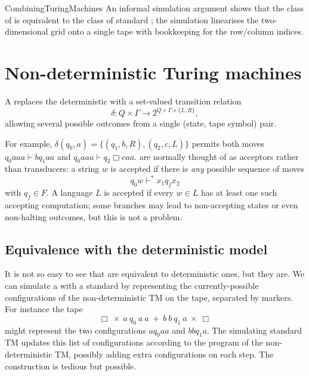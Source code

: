\documentclass[hidelinks]{article}
\begin{document}
\begin{smodule}[title={Further Turing Machine Models, and Combining Turing Machines}]{CombiningTuringMachines}
An informal simulation argument shows that the class of  is equivalent to the class of standard ; the simulation linearises the two-dimensional grid onto a single tape with bookkeeping for the row/column indices.

\section{Non-deterministic Turing machines}

\begin{sdefinition}[for=non-deterministic Turing machine]
A  replaces the deterministic  with a set-valued transition relation
\[
\delta : Q \times \Gamma \to 2^{Q \times \Gamma \times \{L, R\}},
\]
allowing several possible outcomes from a single (state, tape symbol) pair.
\end{sdefinition}

For example, $\delta(q_0, a) = \{(q_1, b, R), (q_2, c, L)\}$ permits both moves $q_0 a a a \vdash b q_1 a a$ and $q_0 a a a \vdash q_2 \Box c a a$.  are normally thought of as acceptors rather than transducers: a string $w$ is accepted if there is \emph{any} possible sequence of moves
\[
q_0 w \vdash^* x_1 q_f x_2
\]
with $q_f \in F$. A language $L$ is accepted if every $w \in L$ has at least one such accepting computation; some branches may lead to non-accepting states or even non-halting outcomes, but this is not a problem.

\subsection{Equivalence with the deterministic model}

It is not so easy to see that  are equivalent to deterministic ones, but they are. We can simulate a  with a standard  by representing the currently-possible configurations of the non-deterministic TM on the tape, separated by markers. For instance the tape
\[
\Box\ \times\ a\ q_0\ a\ a\ +\ b\ b\ q_1\ a\ \times\ \Box
\]
might represent the two configurations $a q_0 a a$ and $b b q_1 a$. The simulating standard TM updates this list of configurations according to the program of the non-deterministic TM, possibly adding extra configurations on each step. The construction is tedious but possible.


\end{smodule}
\end{document}
